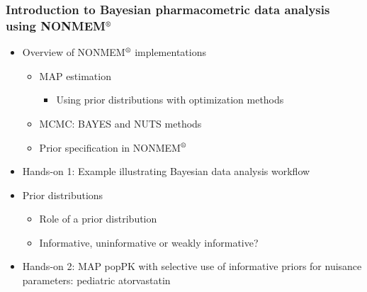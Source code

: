 \documentclass{beamer}
\begin{document}
\begin{frame}
  \frametitle{Introduction to Bayesian pharmacometric data analysis
    using NONMEM$^\text{\textregistered}$}

  \vspace{-10pt}
  \begin{itemize}
  \item Overview of NONMEM$^\text{\textregistered}$ implementations
    \begin{itemize}
    \item MAP estimation
      \begin{itemize}
      \item Using prior distributions with optimization methods
      \end{itemize}
    \item MCMC: BAYES and NUTS methods
    \item Prior specification in NONMEM$^\text{\textregistered}$
    \end{itemize}
  \end{itemize}
  \begin{itemize}
  \item Hands-on 1: Example illustrating Bayesian data analysis
    workflow
  \item Prior distributions
    \begin{itemize}
    \item Role of a prior distribution
    \item Informative, uninformative or weakly informative?
    \end{itemize}
  \end{itemize}
  \begin{itemize}
  \item Hands-on 2: MAP popPK with selective use of informative priors
    for nuisance parameters: pediatric atorvastatin
  \end{itemize}

\end{frame}
\end{document}
